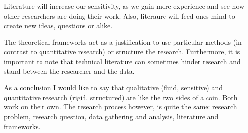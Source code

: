 \documentclass[a4paper,12pt,english]{scrartcl}
\begin{document}
Literature will increase our sensitivity, as we gain more experience and see how other researchers are doing their work. Also, literaure will feed ones mind to create new ideas, questions or alike.

The theoretical frameworks act as a justification to use particular methods (in contrast to quantitative research) or structure the research. Furthermore, it is important to note that technical literature can sometimes hinder research and stand between the researcher and the data.

As a conclusion I would like to say that qualitative (fluid, sensitive) and quantitative research (rigid, structured) are like the two sides of a coin. Both work on their own. The research process however, is quite the same: research problem, research question, data gathering and analysis, literature and frameworks.
\end{document}
